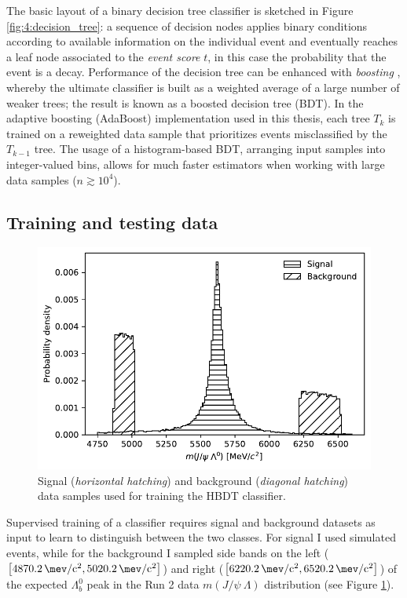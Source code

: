The basic layout of a binary decision tree classifier is sketched in Figure \ref{fig:4:decision_tree}:
a sequence of decision nodes applies binary conditions according to available information on the individual event and eventually reaches a leaf node associated to the \textit{event score} $t$, in this case the probability that the event is a \demonstratorshort decay.
Performance of the decision tree can be enhanced with \textit{boosting} \cite{Yann:2013}, whereby the ultimate classifier is built as a weighted average of a large number of weaker trees;
the result is known as a boosted decision tree (BDT).
In the adaptive boosting (AdaBoost) implementation used in this thesis, each tree $T_k$ is trained on a reweighted data sample that prioritizes events misclassified by the $T_{k-1}$ tree.
The usage of a histogram-based BDT, arranging input samples into integer-valued bins, allows for much faster estimators when working with large data samples ($n \gtrsim {10}^4$).


\subsection{Training and testing data}
\label{sec:4:train_test_data}

\begin{figure}[t]
	\centering
	\includegraphics[width=.6\textwidth]{graphics/04-event_selection/sig_bkg_distribution_balance.pdf}
	\caption{Signal (\textit{horizontal hatching}) and background (\textit{diagonal hatching}) data samples used for training the HBDT classifier.
	}
	\label{fig:4:HBDT_training_data}
\end{figure}

Supervised training of a classifier requires signal and background datasets as input to learn to distinguish between the two classes.
For signal I used simulated \demonstratorshort events, while for the background I sampled side bands on the left ($\left[\SI{4870.2}{\mev \per c^2}, \SI{5020.2}{\mev \per c^2}\right]$) and right ($\left[\SI{6220.2}{\mev \per c^2}, \SI{6520.2}{\mev \per c^2}\right]$) of the expected $\Lambda_b^0$ peak  in the Run 2 data $m(J/\psi~\Lambda)$ distribution (see Figure \ref{fig:4:HBDT_training_data}).

